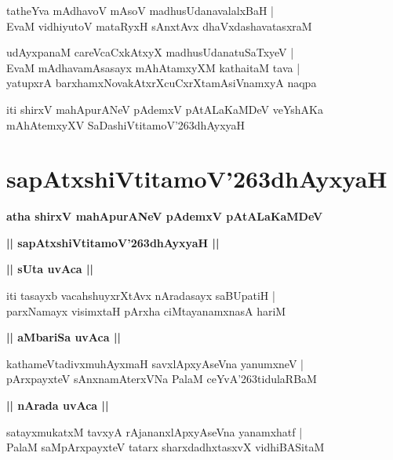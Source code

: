 \documentclass[twoside,12pt,openright]{book}
\def\S{\char'263}
\newcounter{shloka}[chapter]
\def\uvaca#1{\centerline{{\large\textbf{#1}}}}
\begin{document}
\begin{shloka}%
tatheYva mAdhavoV mAsoV madhusUdanavalalxBaH |\\
EvaM vidhiyutoV mataRyxH sAnxtAvx dhaVxdashavatasxraM 

\end{shloka}

\begin{shloka}%
udAyxpanaM careVcaCxkAtxyX madhusUdanatuSaTxyeV |\\
EvaM mAdhavamAsasayx mAhAtamxyXM  kathaitaM tava |\\
yatupxrA barxhamxNovakAtxrXcuCxrXtamAsiVnamxyA naqpa
\end{shloka}

\begin{center}
iti shirxV mahApurANeV pAdemxV pAtALaKaMDeV veYshAKa mAhAtemxyXV 
SaDashiVtitamoV\S dhAyxyaH
\end{center}

\chapter{sapAtxshiVtitamoV\S dhAyxyaH}

\begin{center}
{\LARGE\bfseries atha shirxV mahApurANeV pAdemxV pAtALaKaMDeV }
\end{center}

\begin{center}         
{\LARGE\bfseries || sapAtxshiVtitamoV\S dhAyxyaH ||}
\end{center}

\uvaca{|| sUta uvAca ||}

\begin{shloka}%
iti tasayxb vacahshuyxrXtAvx nAradasayx saBUpatiH |\\
parxNamayx visimxtaH pArxha ciMtayanamxnasA hariM 
\end{shloka}

\uvaca{|| aMbariSa uvAca ||}

\begin{shloka}%
kathameVtadivxmuhAyxmaH savxlApxyAseVna yanumxneV |\\
pArxpayxteV sAnxnamAterxVNa PalaM  ceYvA\S tidulaRBaM 
\end{shloka}

\uvaca{|| nArada uvAca ||}

\begin{shloka}%
satayxmukatxM tavxyA rAjananxlApxyAseVna yanamxhatf |\\
PalaM saMpArxpayxteV tatarx sharxdadhxtasxvX vidhiBASitaM 
\end{shloka}
\end{document}
